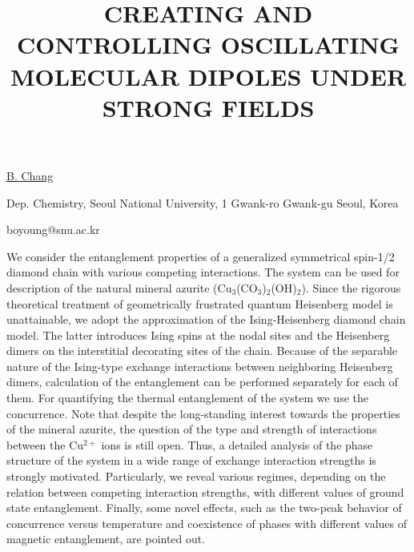 \title{CREATING AND CONTROLLING OSCILLATING MOLECULAR DIPOLES UNDER STRONG FIELDS}

\underline{B. Chang} 

{\normalsize{
\vspace{-4mm}
Dep. Chemistry,
Seoul National University,
1 Gwank-ro Gwank-gu Seoul, Korea

\email boyoung@snu.ac.kr}}

We consider the entanglement properties of a generalized symmetrical spin-1/2 diamond chain with various competing interactions. The system can be used for description of the natural mineral azurite (Cu$_3$(CO$_3$)$_2$(OH)$_2$). Since the rigorous theoretical treatment of geometrically frustrated quantum Heisenberg model is unattainable, we adopt the approximation of the Ising-Heisenberg diamond chain model. The latter introduces Ising spins at the nodal sites and the Heisenberg dimers on the interstitial decorating sites of the chain.  Because of the separable nature of the Ising-type exchange interactions between neighboring Heisenberg dimers, calculation of the entanglement can be performed separately for each of them. For quantifying the thermal entanglement of the system we use the concurrence. Note that despite the long-standing interest towards the properties of the mineral azurite, the question of the type and strength of interactions between the Cu$^{2+}$
ions is still open. Thus, a detailed analysis of the phase structure of the system in a wide range of exchange interaction strengths is strongly motivated. Particularly, we reveal various regimes, depending on the relation between competing interaction strengths, with different values of ground state entanglement. Finally, some novel effects, such as the two-peak behavior of concurrence versus temperature and coexistence of phases with different values of magnetic entanglement, are pointed out.

\vspace{\baselineskip}
